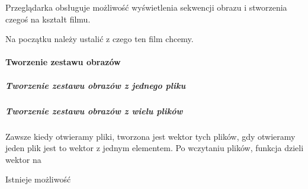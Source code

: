\label{sec:scene-sets}

Przeglądarka obsługuje możliwość wyświetlenia sekwencji obrazu i stworzenia czegoś na kształt filmu.

Na początku należy ustalić z czego ten film chcemy.

\paragraph{Tworzenie zestawu obrazów}


\subparagraph{Tworzenie zestawu obrazów z jednego pliku}



\subparagraph{Tworzenie zestawu obrazów z wielu plików}

Zawsze kiedy otwieramy pliki, tworzona jest wektor tych plików, gdy otwieramy jeden plik jest to wektor z jednym elementem.
Po wczytaniu plików, funkcja  dzieli wektor na 

Istnieje możliwość 